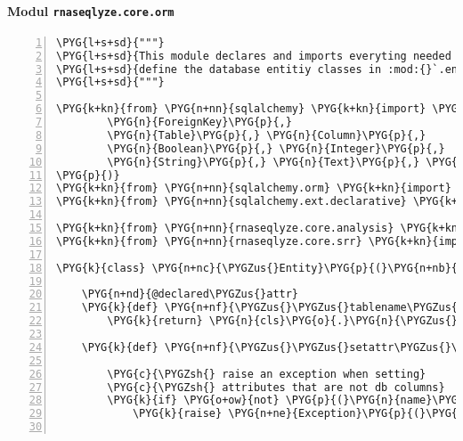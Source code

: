 \paragraph{Modul \texttt{rnaseqlyze.core.orm}}
\label{rnaseqlyze-pdf:modul-rnaseqlyze-core-orm}
\begin{Verbatim}[commandchars=\\\{\},numbers=left,firstnumber=1,stepnumber=5]
\PYG{l+s+sd}{"""}
\PYG{l+s+sd}{This module declares and imports everyting needed to}
\PYG{l+s+sd}{define the database entitiy classes in :mod:{}`.entities{}`.}
\PYG{l+s+sd}{"""}

\PYG{k+kn}{from} \PYG{n+nn}{sqlalchemy} \PYG{k+kn}{import} \PYG{p}{(}
        \PYG{n}{ForeignKey}\PYG{p}{,}
        \PYG{n}{Table}\PYG{p}{,} \PYG{n}{Column}\PYG{p}{,}
        \PYG{n}{Boolean}\PYG{p}{,} \PYG{n}{Integer}\PYG{p}{,}
        \PYG{n}{String}\PYG{p}{,} \PYG{n}{Text}\PYG{p}{,} \PYG{n}{DateTime}
\PYG{p}{)}
\PYG{k+kn}{from} \PYG{n+nn}{sqlalchemy.orm} \PYG{k+kn}{import} \PYG{n}{relationship}\PYG{p}{,} \PYG{n}{backref}
\PYG{k+kn}{from} \PYG{n+nn}{sqlalchemy.ext.declarative} \PYG{k+kn}{import} \PYG{n}{declared\PYGZus{}attr}

\PYG{k+kn}{from} \PYG{n+nn}{rnaseqlyze.core.analysis} \PYG{k+kn}{import} \PYG{n}{Mixins} \PYG{k}{as} \PYG{n}{AnalysisMixins}
\PYG{k+kn}{from} \PYG{n+nn}{rnaseqlyze.core.srr} \PYG{k+kn}{import} \PYG{n}{Mixins} \PYG{k}{as} \PYG{n}{RNASeqRunMixins}

\PYG{k}{class} \PYG{n+nc}{\PYGZus{}Entity}\PYG{p}{(}\PYG{n+nb}{object}\PYG{p}{)}\PYG{p}{:}

    \PYG{n+nd}{@declared\PYGZus{}attr}
    \PYG{k}{def} \PYG{n+nf}{\PYGZus{}\PYGZus{}tablename\PYGZus{}\PYGZus{}}\PYG{p}{(}\PYG{n}{cls}\PYG{p}{)}\PYG{p}{:}
        \PYG{k}{return} \PYG{n}{cls}\PYG{o}{.}\PYG{n}{\PYGZus{}\PYGZus{}name\PYGZus{}\PYGZus{}}\PYG{o}{.}\PYG{n}{lower}\PYG{p}{(}\PYG{p}{)}

    \PYG{k}{def} \PYG{n+nf}{\PYGZus{}\PYGZus{}setattr\PYGZus{}\PYGZus{}}\PYG{p}{(}\PYG{n+nb+bp}{self}\PYG{p}{,} \PYG{n}{name}\PYG{p}{,} \PYG{n}{value}\PYG{p}{)}\PYG{p}{:}

        \PYG{c}{\PYGZsh{} raise an exception when setting}
        \PYG{c}{\PYGZsh{} attributes that are not db columns}
        \PYG{k}{if} \PYG{o+ow}{not} \PYG{p}{(}\PYG{n}{name}\PYG{o}{.}\PYG{n}{startswith}\PYG{p}{(}\PYG{l+s}{'}\PYG{l+s}{\PYGZus{}}\PYG{l+s}{'}\PYG{p}{)} \PYG{o+ow}{or} \PYG{n+nb}{hasattr}\PYG{p}{(}\PYG{n+nb}{type}\PYG{p}{(}\PYG{n+nb+bp}{self}\PYG{p}{)}\PYG{p}{,} \PYG{n}{name}\PYG{p}{)}\PYG{p}{)}\PYG{p}{:}
            \PYG{k}{raise} \PYG{n+ne}{Exception}\PYG{p}{(}\PYG{l+s}{"}\PYG{l+s}{'}\PYG{l+s+si}{\PYGZpc{}s}\PYG{l+s}{'}\PYG{l+s}{ is not a declared attribute}\PYG{l+s}{"} \PYG{o}{\PYGZpc{}} \PYG{n}{name}\PYG{p}{)}


\end{Verbatim}
